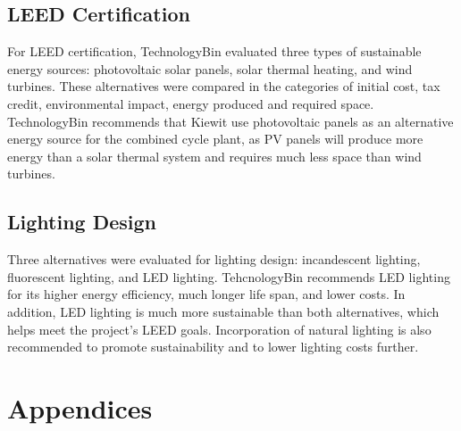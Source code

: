 \documentclass{ceri}
\begin{document}
\subsection{LEED Certification}
For LEED certification, TechnologyBin evaluated three types of sustainable energy sources: photovoltaic solar panels, solar thermal heating, and wind turbines. These alternatives were compared in the categories of initial cost, tax credit, environmental impact, energy produced and required space. TechnologyBin recommends that Kiewit use photovoltaic panels as an alternative energy source for the combined cycle plant, as PV panels will produce more energy than a solar thermal system and requires much less space than wind turbines.

\subsection{Lighting Design}
Three alternatives were evaluated for lighting design: incandescent lighting, fluorescent lighting, and LED lighting. TehcnologyBin recommends LED lighting for its higher energy efficiency, much longer life span, and lower costs. In addition, LED lighting is much more sustainable than both alternatives, which helps meet the project's LEED goals. Incorporation of natural lighting is also recommended to promote sustainability and to lower lighting costs further.

\section{Appendices}
\end{document}
